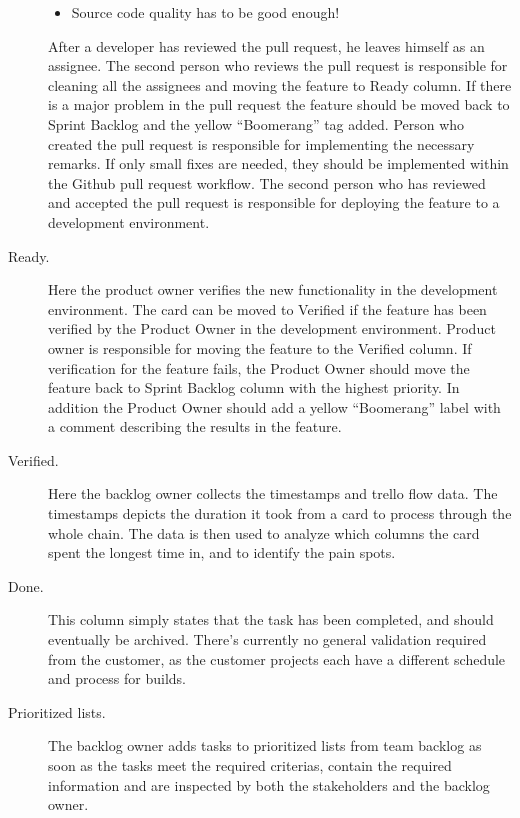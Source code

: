 \documentclass[english]{tktltiki2}
\theoremstyle{definition}
\theoremstyle{remark}
\begin{document}
\begin{description}
\begin{itemize}
	\item  Source code quality has to be good enough!
\end{itemize}
After a developer has reviewed the pull request, he leaves himself as an assignee. The second person who reviews the pull request is responsible for cleaning all the assignees and moving the feature to Ready column. If there is a major problem in the pull request the feature should be moved back to Sprint Backlog and the yellow “Boomerang” tag added. Person who created the pull request is responsible for implementing the necessary remarks.
If only small fixes are needed, they should be implemented within the Github pull request workflow.
The second person who has reviewed and accepted the pull request is responsible for deploying the feature to a development environment.
\item[Ready.] Here the product owner verifies the new functionality in the development environment. The card can be moved to Verified if the feature has been verified by the Product Owner in the development environment. Product owner is responsible for moving the feature to the Verified column.
If verification for the feature fails, the Product Owner should move the feature back to Sprint Backlog column with the highest priority. In addition the Product Owner should add a yellow “Boomerang” label with a comment describing the results in the feature.
\item[Verified.] Here the backlog owner collects the timestamps and trello flow data. The timestamps depicts the duration it took from a card to process through the whole chain. The data is then used to analyze which columns the card spent the longest time in, and to identify the pain spots.
\item[Done.] This column simply states that the task has been completed, and should eventually be archived. There’s currently no general validation required from the customer, as the customer projects each have a different schedule and process for builds.
\item[Prioritized lists.] The backlog owner adds tasks to prioritized lists from team backlog as soon as the tasks meet the required criterias, contain the required information and are inspected by both the stakeholders and the backlog owner.
\end{description}

\end{document}
